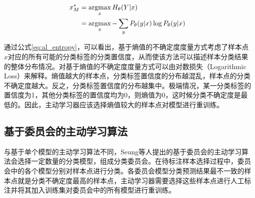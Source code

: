 \begin{align}\label{eq:al_entropy}
\begin{aligned}
x_M^*&=\operatorname*{argmax}_x H_\theta (Y|x)\\
&=\operatorname*{argmax}_x -\sum_{y}P_\theta(y|x)\log P_\theta(y|x)
\end{aligned}
\end{align}

通过公式\ref{eq:al_entropy}，可以看出，基于熵值的不确定度度量方式考虑了样本点$x$对应的所有可能的分类标签的分类置信度，从而使该方法可以描述样本分类结果的整体分布情况。对基于熵值的不确定度度量方式可以由对数损失（Logarithmic Loss）来解释。熵值越大的样本点，分类标签置信度的分布越混乱，样本点的分类不确定度越大。反之，分类标签置信度的分布越集中。极端情况，某一分类标签的置信度为1，其他分类标签的置信度均为0，则熵值为0，这时候分类不确定度是最低的。因此，主动学习器应该选择熵值较大的样本点对模型进行重训练。

\subsection{基于委员会的主动学习算法}
与基于单个模型的主动学习算法不同，Seung等人\cite{freund1997selective}提出的基于委员会的主动学习算法会选择一定数量的分类模型，组成分类委员会。在待标注样本选择过程中，委员会中的各个模型分别对样本点进行分类。各委员会模型分类预测结果最不一致的样本点就是分类不确定度最高的样本点，主动学习器需要选择这些样本点进行人工标注并将其加入训练集对委员会中的所有模型进行重训练。


